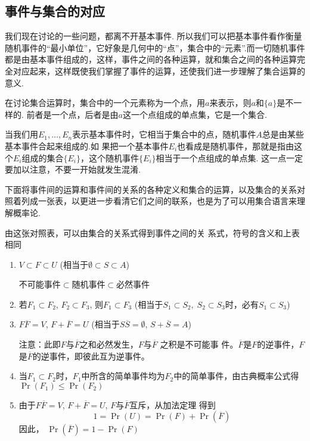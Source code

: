 \subsection{事件与集合的对应}
我们现在讨论的一些问题，都离不开基本事件. 所以我们可以把基本事件看作衡量随机事件的“最小单位”，它好象是几何中的“点”，集合中的“元素”.而一切随机事件都是由基本事件组成的，这样，事件之间的各种运算，就和集合之间的各种运算完全对应起来，这样既使我们掌握了事件的运算，还使我们进一步理解了集合运算的意义.

在讨论集合运算时，集合中的一个元素称为一个点，用$a$来表示，则$a$和$\{a\}$是不一样的. 前者是一个点，后者是由$a$这一个点组成的单点集，它是一个集合.

当我们用$E_1,\ldots,E_n$表示基本事件时，它相当于集合中的点，随机事件$A$总是由某些基本事件合起来组成的.如
果把一个基本事件$E_i$也看成是随机事件，那就是指由这个$E_i$组成的集合$\{E_i\}$，这个随机事件$\{E_i\}$相当于一个点组成的单点集. 这一点一定要加以注意，不要一开始就发生混淆.

下面将事件间的运算和事件间的关系的各种定义和集合的运算，以及集合的关系对照着列成一张表，以更进一步看清它们之间的联系，也是为了可以用集合语言来理解概率论.





























由这张对照表，可以由集合的关系式得到事件之间的关
系式，符号的含义和上表相同
\begin{enumerate}
\item $V\subset F\subset U$ (相当于$\emptyset\subset S\subset A$) 

不可能事件$\subset$随机事件$\subset$必然事件
\item 若$F_1\subset F_2$, $F_2\subset F_3$, 则$F_1\subset F_3$
(相当于$S_1\subset S_2,\; S_2\subset S_3$时，必有$S_1\subset S_3$)
\item $F\overline {F}= V$, $F+ \overline {F}= U$ (相当于$S\overline{S} = \emptyset$, $S+ \overline{S} = A$) 

注意：此即$F$与$\overline F$之和必然发生，$F$与$\overline{F}$ 之积是不可能事
件。$\overline{F}$是$F$的逆事件，$F$是$\overline{F}$的逆事件，即彼此互为逆事件。
\item 当$F_1\subset F_2$时，$F_1$中所含的简单事件均为$F_2$中的简单事件，由古典概率公式得
$\Pr\left(F_{1}\right)\le  \Pr\left(F_{2}\right)$
\item 由于$F\overline{F}= V$, $F+ \overline {F}= U$, $F$与$\overline{F}$互斥，从加法定理
得到
$$1=\Pr(U)=\Pr(F)+\Pr(\overline{F})$$
因此，
$\Pr(\overline{F})=1-\Pr\left(F\right)$
\end{enumerate}

